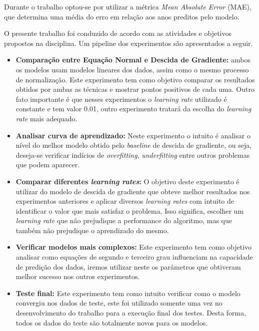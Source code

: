 \documentclass[conference]{IEEEtran}
\begin{document}

Durante o trabalho optou-se por utilizar a métrica \emph{Mean Absolute Error} (MAE), que determina uma média do erro em relação aos anos preditos pelo modelo.

O presente trabalho foi conduzido de acordo com as atividades e objetivos propostos na disciplina. Um pipeline dos experimentos são apresentados a seguir.

\begin{itemize}
	\item \textbf{Comparação entre Equação Normal e Descida de Gradiente: } ambos os modelos usam modelos lineares dos dados, assim como o mesmo processo de normalização. Este experimento tem como objetivo comparar os resultados obtidos por ambas as técnicas e mostrar pontos positivos de cada uma. Outro fato importante é que nesses experimentos o \emph{learning rate} utilizado é constante e tem valor 0.01, outro experimento tratará da escolha do \emph{learning rate} mais adequado.
	\item \textbf{Analisar curva de aprendizado: } Neste experimento o intuito é analisar o nível do melhor modelo obtido pelo \emph{baseline} de descida de gradiente, ou seja, deseja-se verificar indícios de \emph{overfitting}, \emph{underfitting} entre outros problemas que podem aparecer.
	\item \textbf{Comparar diferentes \emph{learning rates}: } O objetivo deste experimento é utilizar do modelo de descida de gradiente que obteve melhor resultados nos experimentos anteriores e aplicar diversos \emph{learning rates} com intuito de identificar o valor que mais satisfaz o problema. Isso significa, escolher um \emph{learning rate} que não prejudique a performance do algoritmo, mas que também não prejudique o aprendizado do mesmo.
	\item \textbf{Verificar modelos mais complexos: } Este experimento tem como objetivo analisar como equações de segundo e terceiro grau influenciam na capacidade de predição dos dados, iremos utilizar neste os parâmetros que obtiveram melhor sucesso nos outros experimentos.
	\item \textbf{Teste final: } Este experimento tem como intuito verificar como o modelo convergiu nos dados de teste, este foi utilizado somente uma vez no desenvolvimento do trabalho para a execução final dos testes. Desta forma, todos os dados do teste são totalmente novos para os modelos.
\end{itemize}
\end{document}
